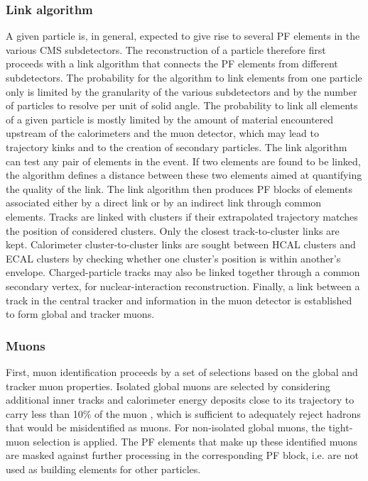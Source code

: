 \subsubsection{Link algorithm}
A given particle is, in general, expected to give rise to several PF elements in the various CMS subdetectors. The reconstruction of a particle therefore first proceeds with a link algorithm that connects the PF elements from different subdetectors. The probability for the algorithm to link elements from one particle only is limited by the granularity of the various subdetectors and by the number of particles to resolve per unit of solid angle. The probability to link all elements of a given particle is mostly limited by the amount of material encountered upstream of the calorimeters and the muon detector, which may lead to trajectory kinks and to the creation of secondary particles. The link algorithm can test any pair of elements in the event. If two elements are found to be linked, the algorithm defines a distance between these two elements aimed at quantifying the quality of the link. The link algorithm then produces PF blocks of elements associated either by a direct link or by an indirect link through common elements. Tracks are linked with clusters if their extrapolated trajectory matches the position of considered clusters. Only the closest track-to-cluster links are kept. Calorimeter cluster-to-cluster links are sought between HCAL clusters and ECAL clusters by checking whether one cluster's position is within another's envelope. Charged-particle tracks may also be linked together through a common secondary vertex, for nuclear-interaction reconstruction. Finally, a link between a track in the central tracker and information in the muon detector is established to form global and tracker muons.

\subsubsection{Muons} First, muon identification proceeds by a set of selections based on the global and tracker muon properties. Isolated global muons are selected by considering additional inner tracks and calorimeter energy deposits close to its trajectory to carry less than 10$\%$ of the muon \pt, which is sufficient to adequately reject hadrons that would be misidentified as muons. For non-isolated global muons, the tight-muon selection \cite{collaboration_2012} is applied. The PF elements that make up these identified muons are masked against further processing in the corresponding PF block, i.e. are not used as building elements for other particles.

